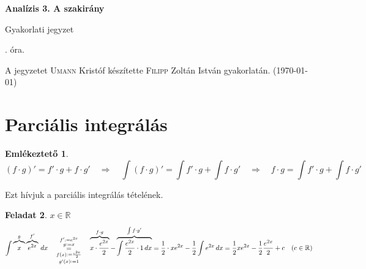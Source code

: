 \documentclass[a4paper,11.5pt]{article}
\begin{document}
	\setlength\parindent{0pt}
	\def\a{\textbf{a}}
	\def\b{\textbf{b}}
	\def\N{\hskip 10 true mm}
	\def\a{\textbf{a}}
	\def\b{\textbf{b}}
	\def\c{\textbf{c}}
	\def\d{\textbf{d}}
	\def\e{\textbf{e}}
	\def\gg{$\gamma$}
	\def\vi{\textbf{i}}
	\def\jj{\textbf{j}}
	\def\kk{\textbf{k}}
	\def\fh{\overrightarrow}
	\def\l{\lambda}
	\def\m{\mu}
	\def\v{\textbf{v}}
	\def\0{\textbf{0}}
	\def\s{\hspace{0.2mm}\vphantom{\beta}}
	\def\Z{\mathbb{Z}}
	\def\Q{\mathbb{Q}}
	\def\R{\mathbb{R}}
	\def\C{\mathbb{C}}
	\def\N{\mathbb{N}}
	\def\Rn{\mathbb{R}^{n}}
	\def\Ra{\overline{\mathbb{R}}}
	\def\sume{\displaystyle\sum_{n=1}^{+\infty}}
	\def\sumn{\displaystyle\sum_{n=0}^{+\infty}}
	\def\biz{\emph{Bizonyítás:\ }}
	\def\narrow{\underset{n\rightarrow+\infty}{\longrightarrow}}
	\def\limn{\displaystyle\lim_{n\to +\infty}}
	
	\theoremstyle{definition}
	\newtheorem{theorem}{Tétel}[subsection] %
	
	\theoremstyle{definition}
	\newtheorem{definition}[theorem]{Definíció} %
	\newtheorem{example}[theorem]{Példa} %
	\newtheorem{exercise}[theorem]{Házi feladat} %
	\newtheorem{note}[theorem]{Megjegyzés} %
	\newtheorem{task}[theorem]{Feladat} %
	\newtheorem{revision}[theorem]{Emlékeztető} %
	\begin{center}
		{\LARGE\textbf{Analízis 3. A szakirány}}
		\smallskip
		
		{\Large Gyakorlati jegyzet}
		
		. óra.
	\end{center}
	A jegyzetet \textsc{Umann} Kristóf készítette \textsc{Filipp} Zoltán István gyakorlatán. (\today)
	\section{Parciális integrálás}
	\begin{revision}
		\[ (f\cdot g)'=f'\cdot g + f\cdot g'\quad \Rightarrow\quad \int(f\cdot g)'=\int f'\cdot g + \int f\cdot g'\quad \Rightarrow\quad f\cdot g=\int f'\cdot g + \int f\cdot g'\]
		\begin{center}	
		\end{center}
		Ezt hívjuk a parciális integrálás tételének.
	\end{revision}
	\begin{task}$x\in\R$
		\[ \int \overbrace{x\vphantom{e^2}}^{g}\overbrace{e^{2x}}^{f'}\,dx\quad \underset{g'(x):=1}{\overset{f':=e^{2x}}{\overset{g:=x}{\underset{f(x):=\frac{e^{2x}}{2}}{=}}}}
		\quad \overbrace{x\cdot\frac{e^{2x}}{2}}^{f\cdot g}-\overbrace{\int\frac{e^{2x}}{2}\cdot1\,dx}^{\int f\cdot g'}=\frac{1}{2}\cdot xe^{2x}-\frac{1}{2}\int e^{2x}\,dx=\frac{1}{2}xe^{2x}-\frac{1}{2}\frac{e^{2x}}{2}+c\quad (c\in\R) \]
	\end{task}
	\bigskip
	
\end{document}
